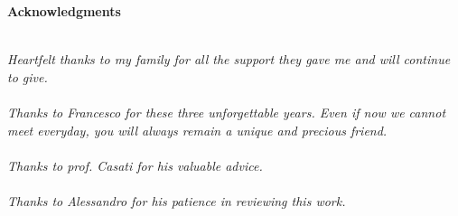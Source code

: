 \thispagestyle{empty}

\begin{center}
  {\bf \Huge Acknowledgments}
\end{center}

\vspace{4cm}


\emph{\\
  Heartfelt thanks to my family for all the support they gave me and will continue to give.\\ \\
  Thanks to Francesco for these three unforgettable years. Even if now we cannot meet everyday, you will always remain a unique and precious friend.\\ \\
  Thanks to prof. Casati for his valuable advice.\\ \\
  Thanks to Alessandro for his patience in reviewing this work.\\
}